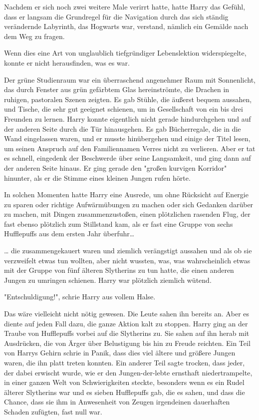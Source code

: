 {Nachdem er sich noch zwei weitere Male verirrt hatte, hatte Harry das Gefühl, dass er langsam die Grundregel für die Navigation durch das sich ständig verändernde Labyrinth, das Hogwarts war, verstand, nämlich ein Gemälde nach dem Weg zu fragen.

Wenn dies eine Art von unglaublich tiefgründiger Lebenslektion widerspiegelte, konnte er nicht herausfinden, was es war.

Der grüne Studienraum war ein überraschend angenehmer Raum mit Sonnenlicht, das durch Fenster aus grün gefärbtem Glas hereinströmte, die Drachen in ruhigen, pastoralen Szenen zeigten. Es gab Stühle, die äußerst bequem aussahen, und Tische, die sehr gut geeignet schienen, um in Gesellschaft von ein bis drei Freunden zu lernen. Harry konnte eigentlich nicht gerade hindurchgehen und auf der anderen Seite durch die Tür hinausgehen. Es gab Bücherregale, die in die Wand eingelassen waren, und er musste hinübergehen und einige der Titel lesen, um seinen Anspruch auf den Familiennamen Verres nicht zu verlieren. Aber er tat es schnell, eingedenk der Beschwerde über seine Langsamkeit, und ging dann auf der anderen Seite hinaus. Er ging gerade den "großen kurvigen Korridor" hinunter, als er die Stimme eines kleinen Jungen rufen hörte.

In solchen Momenten hatte Harry eine Ausrede, um ohne Rücksicht auf Energie zu sparen oder richtige Aufwärmübungen zu machen oder sich Gedanken darüber zu machen, mit Dingen zusammenzustoßen, einen plötzlichen rasenden Flug, der fast ebenso plötzlich zum Stillstand kam, als er fast eine Gruppe von sechs Hufflepuffs aus dem ersten Jahr überfuhr…

… die zusammengekauert waren und ziemlich verängstigt aussahen und als ob sie verzweifelt etwas tun wollten, aber nicht wussten, was, was wahrscheinlich etwas mit der Gruppe von fünf älteren Slytherins zu tun hatte, die einen anderen Jungen zu umringen schienen. Harry war plötzlich ziemlich wütend.

"Entschuldigung!", schrie Harry aus vollem Halse.

Das wäre vielleicht nicht nötig gewesen. Die Leute sahen ihn bereits an. Aber es diente auf jeden Fall dazu, die ganze Aktion kalt zu stoppen. Harry ging an der Traube von Hufflepuffs vorbei auf die Slytherins zu. Sie sahen auf ihn herab mit Ausdrücken, die von Ärger über Belustigung bis hin zu Freude reichten. Ein Teil von Harrys Gehirn schrie in Panik, dass dies viel ältere und größere Jungen waren, die ihn platt treten konnten. Ein anderer Teil sagte trocken, dass jeder, der dabei erwischt wurde, wie er den Jungen-der-lebte ernsthaft niedertrampelte, in einer ganzen Welt von Schwierigkeiten steckte, besonders wenn es ein Rudel älterer Slytherins war und es sieben Hufflepuffs gab, die es sahen, und dass die Chance, dass sie ihm in Anwesenheit von Zeugen irgendeinen dauerhaften Schaden zufügten, fast null war.

}
